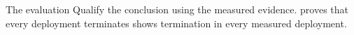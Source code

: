 \documentclass{article}
\begin{document}
The evaluation
  {Qualify the conclusion using the measured evidence.}
  {proves that every deployment terminates}
  {shows termination in every measured deployment}.
\end{document}
